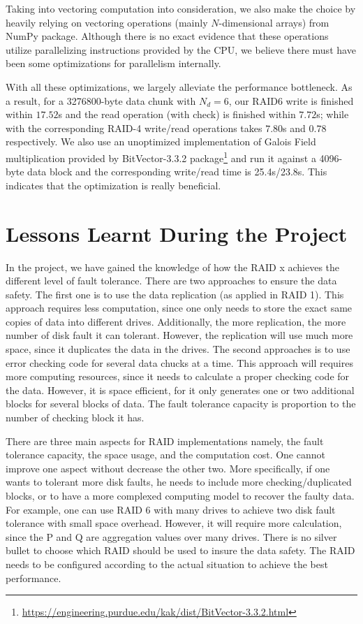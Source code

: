 Taking into vectoring computation into consideration, we also make the choice by heavily relying on vectoring operations (mainly $N$-dimensional arrays) from NumPy package. Although there is no exact evidence that these operations utilize parallelizing instructions provided by the CPU, we believe there must have been some optimizations for parallelism internally.

With all these optimizations, we largely alleviate the performance bottleneck. As a result, for a 3276800-byte data chunk with $N_d=6$, our RAID6 write is finished within $17.52$s and the read operation (with check) is finished within $7.72$s; while with the corresponding RAID-4 write/read operations takes $7.80$s and $0.78$ respectively. We also use an unoptimized implementation of Galois Field multiplication provided by BitVector-3.3.2 package\footnote{\url{https://engineering.purdue.edu/kak/dist/BitVector-3.3.2.html}} and run it against a 4096-byte data block and the corresponding write/read time is 25.4s/23.8s. This indicates that the optimization is really beneficial.


\section{Lessons Learnt During the Project}
In the project, we have gained the knowledge of how the RAID x achieves the different level of fault tolerance. There are two approaches to ensure the data safety. The first one is to use the data replication (as applied in RAID 1). This approach requires less computation, since one only needs to store the exact same copies of data into different drives. Additionally, the more replication, the more number of disk fault it can tolerant. However, the replication will use much more space, since it duplicates the data in the drives. The second approaches is to use error checking code for several data chucks at a time. This approach will requires more computing resources, since it needs to calculate a proper checking code for the data. However, it is space efficient, for it only generates one or two additional blocks for several blocks of data. The fault tolerance capacity is proportion to the number of checking block it has. 

There are three main aspects for RAID implementations namely, the fault tolerance capacity, the space usage, and the computation cost. One cannot improve one aspect without decrease the other two. More specifically, if one wants to tolerant more disk faults, he needs to include more checking/duplicated blocks, or to have a more complexed computing model to recover the faulty data. For example, one can use RAID 6 with many drives to achieve two disk fault tolerance with small space overhead. However, it will require more calculation, since the P and Q are aggregation values over many drives. There is no silver bullet to choose which RAID should be used to insure the data safety. The RAID needs to be configured according to the actual situation to achieve the best performance.

